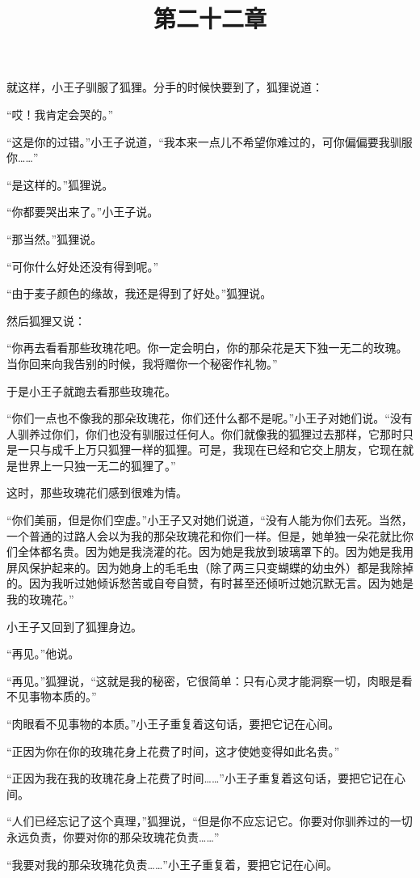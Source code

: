 就这样，小王子驯服了狐狸。分手的时候快要到了，狐狸说道：

“哎！我肯定会哭的。”

“这是你的过错。”小王子说道，“我本来一点儿不希望你难过的，可你偏偏要我驯服你\ldots{}\ldots{}”

“是这样的。”狐狸说。

“你都要哭出来了。”小王子说。

“那当然。”狐狸说。

“可你什么好处还没有得到呢。”

“由于麦子颜色的缘故，我还是得到了好处。”狐狸说。

然后狐狸又说：

“你再去看看那些玫瑰花吧。你一定会明白，你的那朵花是天下独一无二的玫瑰。当你回来向我告别的时候，我将赠你一个秘密作礼物。”

于是小王子就跑去看那些玫瑰花。

“你们一点也不像我的那朵玫瑰花，你们还什么都不是呢。”小王子对她们说。“没有人驯养过你们，你们也没有驯服过任何人。你们就像我的狐狸过去那样，它那时只是一只与成千上万只狐狸一样的狐狸。可是，我现在已经和它交上朋友，它现在就是世界上一只独一无二的狐狸了。”

这时，那些玫瑰花们感到很难为情。

“你们美丽，但是你们空虚。”小王子又对她们说道，“没有人能为你们去死。当然，一个普通的过路人会以为我的那朵玫瑰花和你们一样。但是，她单独一朵花就比你们全体都名贵。因为她是我浇灌的花。因为她是我放到玻璃罩下的。因为她是我用屏风保护起来的。因为她身上的毛毛虫（除了两三只变蝴蝶的幼虫外）都是我除掉的。因为我听过她倾诉愁苦或自夸自赞，有时甚至还倾听过她沉默无言。因为她是我的玫瑰花。”

小王子又回到了狐狸身边。

“再见。”他说。

“再见。”狐狸说，“这就是我的秘密，它很简单：只有心灵才能洞察一切，肉眼是看不见事物本质的。”

“肉眼看不见事物的本质。”小王子重复着这句话，要把它记在心间。

“正因为你在你的玫瑰花身上花费了时间，这才使她变得如此名贵。”

“正因为我在我的玫瑰花身上花费了时间\ldots{}\ldots{}”小王子重复着这句话，要把它记在心间。

“人们已经忘记了这个真理，”狐狸说，“但是你不应忘记它。你要对你驯养过的一切永远负责，你要对你的那朵玫瑰花负责\ldots{}\ldots{}”

“我要对我的那朵玫瑰花负责\ldots{}\ldots{}”小王子重复着，要把它记在心间。

\title{第二十二章}

